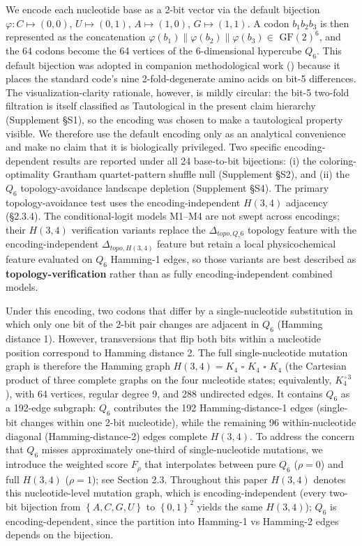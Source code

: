 \documentclass[preprint,11pt,authoryear,a4paper]{elsarticle}
\begin{document}
We encode each nucleotide base as a 2-bit vector via the default
bijection \(\varphi:C \mapsto (0,0)\), \(U \mapsto (0,1)\),
\(A \mapsto (1,0)\), \(G \mapsto (1,1)\). A codon \(b_{1}b_{2}b_{3}\) is
then represented as the concatenation
\(\varphi(b_{1})\|\varphi(b_{2})\|\varphi(b_{3}) \in {\text{ GF}(2)}^{6}\),
and the 64 codons become the 64 vertices of the 6-dimensional hypercube
\(Q_{6}\). This default bijection was adopted in companion
methodological work (\citep{clayworth2026}) because it places the
standard code's nine 2-fold-degenerate amino acids on bit-5 differences.
The visualization-clarity rationale, however, is mildly circular: the
bit-5 two-fold filtration is itself classified as Tautological in the
present claim hierarchy (Supplement §S1), so the encoding was chosen to
make a tautological property visible. We therefore use the default
encoding only as an analytical convenience and make no claim that it is
biologically privileged. Two specific encoding-dependent results are
reported under all 24 base-to-bit bijections: (i) the
coloring-optimality Grantham quartet-pattern shuffle null (Supplement
§S2), and (ii) the \(Q_{6}\) topology-avoidance landscape depletion
(Supplement §S4). The primary topology-avoidance test uses the
encoding-independent \(H(3,4)\) adjacency (§2.3.4). The
conditional-logit models M1--M4 are not swept across encodings; their
\(H(3,4)\) verification variants replace the \(\Delta_{topo,Q\_ 6}\)
topology feature with the encoding-independent \(\Delta_{topo,H(3,4)}\)
feature but retain a local physicochemical feature evaluated on
\(Q_{6}\) Hamming-1 edges, so those variants are best described as
\textbf{topology-verification} rather than as fully encoding-independent
combined models.

Under this encoding, two codons that differ by a single-nucleotide
substitution in which only one bit of the 2-bit pair changes are
adjacent in \(Q_{6}\) (Hamming distance 1). However, transversions that
flip both bits within a nucleotide position correspond to Hamming
distance 2. The full single-nucleotide mutation graph is therefore the
Hamming graph \(H(3,4) = K_{4}\, \ensuremath{\,\square\,}\, K_{4}\, \ensuremath{\,\square\,}\, K_{4}\) (the Cartesian
product of three complete graphs on the four nucleotide states;
equivalently, \(K_{4}^{\ensuremath{\,\square\,}3}\)), with 64 vertices, regular degree 9, and
288 undirected edges. It contains \(Q_{6}\) as a 192-edge subgraph:
\(Q_{6}\) contributes the 192 Hamming-distance-1 edges (single-bit
changes within one 2-bit nucleotide), while the remaining 96
within-nucleotide diagonal (Hamming-distance-2) edges complete
\(H(3,4)\). To address the concern that \(Q_{6}\) misses approximately
one-third of single-nucleotide mutations, we introduce the weighted
score \(F_{\rho}\) that interpolates between pure \(Q_{6}\)
(\(\rho = 0\)) and full \(H(3,4)\) (\(\rho = 1\)); see Section 2.3.
Throughout this paper \(H(3,4)\) denotes this nucleotide-level mutation
graph, which is encoding-independent (every two-bit bijection from
\(\left\{ A,C,G,U \right\}\) to \(\left\{ 0,1 \right\}^{2}\) yields the
same \(H(3,4)\)); \(Q_{6}\) is encoding-dependent, since the partition
into Hamming-1 vs Hamming-2 edges depends on the bijection.
\end{document}
